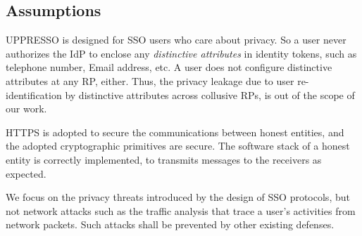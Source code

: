 
\subsection{Assumptions}
UPPRESSO is designed for SSO users who care about privacy.
So a user never authorizes the IdP to enclose any \emph{distinctive attributes} in identity tokens,
 such as telephone number, Email address, etc.
A user does not configure  distinctive attributes at any RP, either.
Thus, the privacy leakage due to user re-identification by distinctive attributes across collusive RPs,
    is out of the scope of our work.

HTTPS is adopted to secure the communications between honest entities,
 and the adopted cryptographic primitives are secure.
The software stack of a honest entity is correctly implemented,
     to transmits messages to the receivers as expected.

We focus on the privacy threats introduced by the design of SSO protocols,
    but not network attacks such as the traffic analysis that trace a user's activities from network packets.
Such attacks shall be prevented by other existing defenses.






